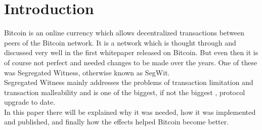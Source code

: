 
\section{Introduction}
\label{ch:Introduction}


Bitcoin is an online currency which allows decentralized transactions between peers of the Bitcoin network. It is a network which is thought through and discussed very well in the first whitepaper released on Bitcoin. \cite{nakamoto} But even then it is of course not perfect and needed changes to be made over the years. One of these was Segregated Witness, otherwise known as SegWit. \\
Segregated Witness mainly addresses the problems of transaction limitation and transaction malleability and is one of the biggest, if not the biggest \cite{bitoinmagazine}, protocol upgrade to date. \\
In this paper there will be explained why it was needed, how it was implemented and published, and finally how the effects helped Bitcoin become better.